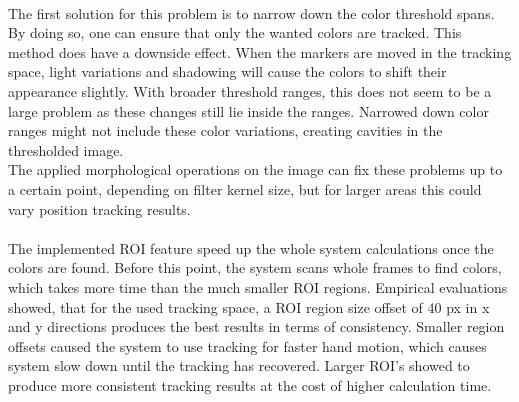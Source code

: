 \\The first solution for this problem is to narrow down the color threshold spans. By doing so, one can ensure that only the wanted colors are tracked. This method does have a downside effect. When the markers are moved in the tracking space, light variations and shadowing will cause the colors to shift their appearance slightly. With broader threshold ranges, this does not seem to be a large problem as these changes still lie inside the ranges. Narrowed down color ranges might not include these color variations, creating cavities in the thresholded image.\\ The applied morphological operations on the image can fix these problems up to a certain point, depending on filter kernel size, but for larger areas this could vary position tracking results.\\\\The implemented ROI feature speed up the whole system calculations once the colors are found. Before this point, the system scans whole frames to find colors, which takes more time than the much smaller ROI regions.
Empirical evaluations showed, that for the used tracking space, a ROI region size offset of 40 px in x and y directions produces the best results in terms of consistency. Smaller region offsets caused the system to use tracking for faster hand motion, which causes system slow down until the tracking has recovered. Larger ROI's showed to produce more consistent tracking results at the cost of higher calculation time.
